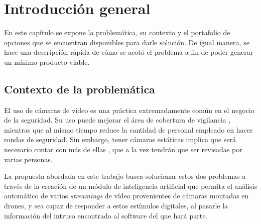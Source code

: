 
\chapter{Introducción general} %

\label{Chapter1} %
\label{IntroGeneral}


\newcommand{\keyword}[1]{\textbf{#1}}
\newcommand{\tabhead}[1]{\textbf{#1}}
\newcommand{\code}[1]{\texttt{#1}}
\newcommand{\file}[1]{\texttt{\bfseries#1}}
\newcommand{\option}[1]{\texttt{\itshape#1}}
\newcommand{\grados}{$^{\circ}$}



En este capítulo se expone la problemática, su contexto y el portafolio de opciones que se encuentran disponibles para darle solución. De igual manera, se hace una descripción rápida de cómo se acotó el problema a fin de poder generar un mínimo producto viable.

\section{Contexto de la problemática}

El uso de cámaras de vídeo es una práctica extremadamente común en el negocio de la seguridad. Su uso puede mejorar el área de cobertura de vigilancia \cite{5}, mientras que al mismo tiempo reduce la cantidad de personal empleado en hacer rondas de seguridad. Sin embargo, tener cámaras estáticas implica que será necesario contar con más de ellas \cite{4}, que a la vez tendrán que ser revisadas por varias personas.

La propuesta abordada en este trabajo busca solucionar estos dos problemas a través de la creación de un módulo de inteligencia artificial que permita el análisis automático de varios \textit{streamings} de vídeo provenientes de cámaras montadas en drones, y sea capaz de responder a estos estímulos digitales, al pasarle la información del intruso encontrado al software del que hará parte.

